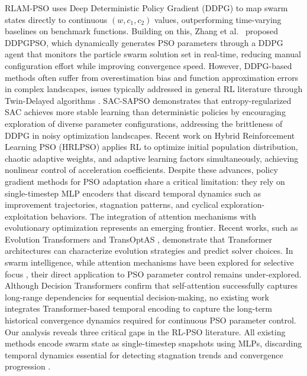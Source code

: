 \documentclass[final,5p,times]{elsarticle}
\begin{document}
RLAM-PSO \cite{Yin2023RLAMPSO} uses Deep Deterministic Policy Gradient (DDPG) \cite{Lillicrap2016Continuous} to map swarm states directly to continuous $(w, c_1, c_2)$ values, outperforming time-varying baselines on benchmark functions.
Building on this, Zhang et al.\ \cite{Zhang2024DDPGPSO} proposed DDPGPSO, which dynamically generates PSO parameters through a DDPG agent that monitors the particle swarm solution set in real-time, reducing manual configuration effort while improving convergence speed.
However, DDPG-based methods often suffer from overestimation bias and function approximation errors in complex landscapes, issues typically addressed in general RL literature through Twin-Delayed algorithms \cite{Fujimoto2018Addressing}.
SAC-SAPSO \cite{vonEschwege2024Soft} demonstrates that entropy-regularized SAC achieves more stable learning than deterministic policies by encouraging exploration of diverse parameter configurations, addressing the brittleness of DDPG in noisy optimization landscapes.
Recent work on Hybrid Reinforcement Learning PSO (HRLPSO) \cite{Liu2023HRLPSO} applies RL to optimize initial population distribution, chaotic adaptive weights, and adaptive learning factors simultaneously, achieving nonlinear control of acceleration coefficients.
Despite these advances, policy gradient methods for PSO adaptation share a critical limitation: they rely on single-timestep MLP encoders that discard temporal dynamics such as improvement trajectories, stagnation patterns, and cyclical exploration-exploitation behaviors. The integration of attention mechanisms with evolutionary optimization represents an emerging frontier.
Recent works, such as Evolution Transformers \cite{Lange2024Evolution} and TransOptAS \cite{Cenikj2024TransOptAS}, demonstrate that Transformer architectures can characterize evolution strategies and predict solver choices.
In swarm intelligence, while attention mechanisms have been explored for selective focus \cite{AlRifaie2017Swarmic}, their direct application to PSO parameter control remains under-explored.
Although Decision Transformers \cite{Chen2021Decision} confirm that self-attention successfully captures long-range dependencies for sequential decision-making, no existing work integrates Transformer-based temporal encoding to capture the long-term historical convergence dynamics required for continuous PSO parameter control. Our analysis reveals three critical gaps in the RL-PSO literature.
All existing methods encode swarm state as single-timestep snapshots using MLPs, discarding temporal dynamics essential for detecting stagnation trends and convergence progression \cite{Lesort2018State}.
\end{document}
